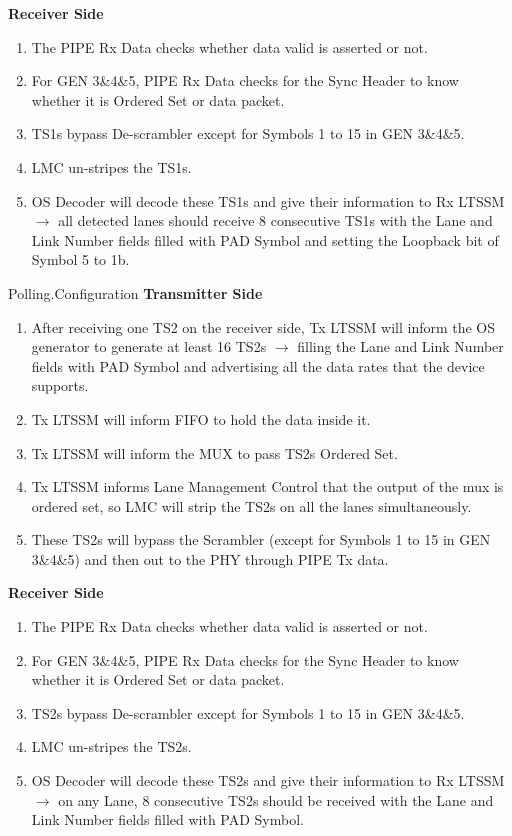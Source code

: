   \textbf{Receiver Side}
  \begin{enumerate}
    
   \item The PIPE Rx Data checks whether data valid is asserted or not.
   \item For GEN 3\&4\&5, PIPE Rx Data checks for the Sync Header to know whether it is Ordered Set or data packet.
   \item TS1s bypass De-scrambler except for Symbols 1 to 15 in GEN 3\&4\&5. 
   \item LMC un-stripes the TS1s. 
   \item OS Decoder will decode these TS1s and give their information to Rx LTSSM $ \rightarrow$ all detected lanes should receive 8 consecutive TS1s with the Lane and Link Number fields filled with PAD Symbol and setting the Loopback bit of Symbol 5 to 1b.

  \end{enumerate}
 Polling.Configuration
  \newline \textbf{Transmitter Side}
  \begin{enumerate}
    
    \item After receiving one TS2 on the receiver side, Tx LTSSM will inform the OS generator to generate at least 16 TS2s $ \rightarrow$ filling the Lane and Link Number fields with PAD Symbol and advertising all the data rates that the device supports.
    \item Tx LTSSM will inform FIFO to hold the data inside it.
    \item Tx LTSSM will inform the MUX to pass TS2s Ordered Set.
    \item Tx LTSSM informs Lane Management Control that the output of the mux is ordered set, so LMC will strip the TS2s on all the lanes simultaneously.
    \item  These TS2s will bypass the Scrambler (except for Symbols 1 to 15 in GEN 3\&4\&5) and then out to the PHY through PIPE Tx data.

  \end{enumerate} 
  \textbf{Receiver Side}
  \begin{enumerate}
    
    \item The PIPE Rx Data checks whether data valid is asserted or not.
    \item For GEN 3\&4\&5, PIPE Rx Data checks for the Sync Header to know whether it is Ordered Set or data packet.
    \item TS2s bypass De-scrambler except for Symbols 1 to 15 in GEN 3\&4\&5. 
    \item LMC un-stripes the TS2s. 
    \item OS Decoder will decode these TS2s and give their information to Rx LTSSM $ \rightarrow$ on any Lane, 8 consecutive TS2s should be received with the Lane and Link Number fields filled with PAD Symbol.
  \end{enumerate}

